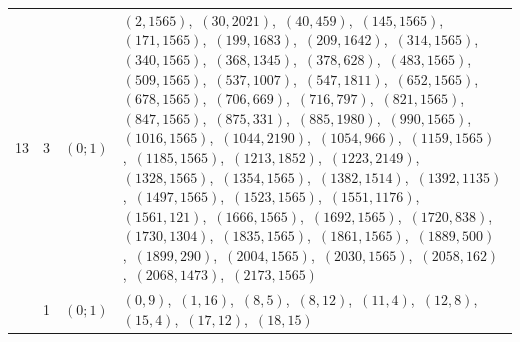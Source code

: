 \documentclass[11pt]{article}
\begin{document}
\begin{longtable}{@{}rrl>{\raggedright\arraybackslash}p{}@{}}
13 & 3 & $(0;1)$ & $(2,1565)$,\allowbreak\ $(30,2021)$,\allowbreak\ $(40,459)$,\allowbreak\ $(145,1565)$,\allowbreak\ $(171,1565)$,\allowbreak\ $(199,1683)$,\allowbreak\ $(209,1642)$,\allowbreak\ $(314,1565)$,\allowbreak\ $(340,1565)$,\allowbreak\ $(368,1345)$,\allowbreak\ $(378,628)$,\allowbreak\ $(483,1565)$,\allowbreak\ $(509,1565)$,\allowbreak\ $(537,1007)$,\allowbreak\ $(547,1811)$,\allowbreak\ $(652,1565)$,\allowbreak\ $(678,1565)$,\allowbreak\ $(706,669)$,\allowbreak\ $(716,797)$,\allowbreak\ $(821,1565)$,\allowbreak\ $(847,1565)$,\allowbreak\ $(875,331)$,\allowbreak\ $(885,1980)$,\allowbreak\ $(990,1565)$,\allowbreak\ $(1016,1565)$,\allowbreak\ $(1044,2190)$,\allowbreak\ $(1054,966)$,\allowbreak\ $(1159,1565)$,\allowbreak\ $(1185,1565)$,\allowbreak\ $(1213,1852)$,\allowbreak\ $(1223,2149)$,\allowbreak\ $(1328,1565)$,\allowbreak\ $(1354,1565)$,\allowbreak\ $(1382,1514)$,\allowbreak\ $(1392,1135)$,\allowbreak\ $(1497,1565)$,\allowbreak\ $(1523,1565)$,\allowbreak\ $(1551,1176)$,\allowbreak\ $(1561,121)$,\allowbreak\ $(1666,1565)$,\allowbreak\ $(1692,1565)$,\allowbreak\ $(1720,838)$,\allowbreak\ $(1730,1304)$,\allowbreak\ $(1835,1565)$,\allowbreak\ $(1861,1565)$,\allowbreak\ $(1889,500)$,\allowbreak\ $(1899,290)$,\allowbreak\ $(2004,1565)$,\allowbreak\ $(2030,1565)$,\allowbreak\ $(2058,162)$,\allowbreak\ $(2068,1473)$,\allowbreak\ $(2173,1565)$\\
\addlinespace[3pt]
19 & 1 & $(0;1)$ & $(0,9)$,\allowbreak\ $(1,16)$,\allowbreak\ $(8,5)$,\allowbreak\ $(8,12)$,\allowbreak\ $(11,4)$,\allowbreak\ $(12,8)$,\allowbreak\ $(15,4)$,\allowbreak\ $(17,12)$,\allowbreak\ $(18,15)$\\

\end{longtable}
\end{document}
